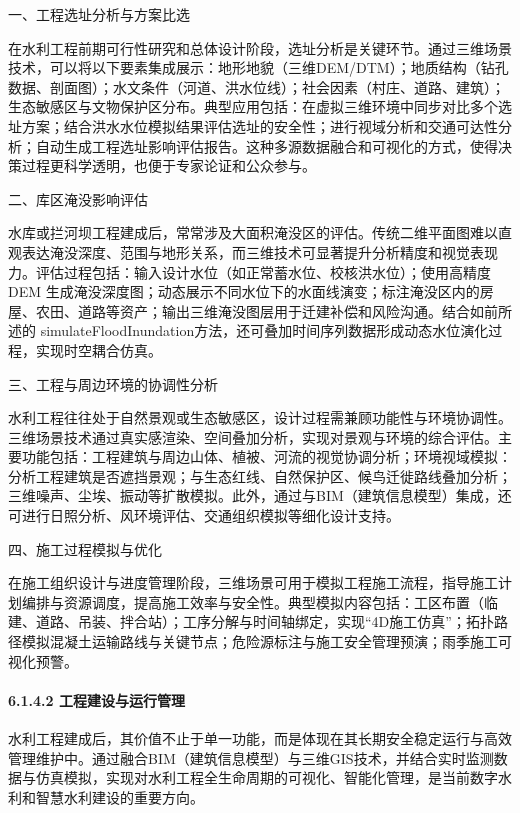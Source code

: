 一、工程选址分析与方案比选

在水利工程前期可行性研究和总体设计阶段，选址分析是关键环节。通过三维场景技术，可以将以下要素集成展示：地形地貌（三维DEM/DTM）；地质结构（钻孔数据、剖面图）；水文条件（河道、洪水位线）；社会因素（村庄、道路、建筑）；生态敏感区与文物保护区分布。典型应用包括：在虚拟三维环境中同步对比多个选址方案；结合洪水水位模拟结果评估选址的安全性；进行视域分析和交通可达性分析；自动生成工程选址影响评估报告。这种多源数据融合和可视化的方式，使得决策过程更科学透明，也便于专家论证和公众参与。

二、库区淹没影响评估

水库或拦河坝工程建成后，常常涉及大面积淹没区的评估。传统二维平面图难以直观表达淹没深度、范围与地形关系，而三维技术可显著提升分析精度和视觉表现力。评估过程包括：输入设计水位（如正常蓄水位、校核洪水位）；使用高精度 DEM 生成淹没深度图；动态展示不同水位下的水面线演变；标注淹没区内的房屋、农田、道路等资产；输出三维淹没图层用于迁建补偿和风险沟通。结合如前所述的 simulateFloodInundation方法，还可叠加时间序列数据形成动态水位演化过程，实现时空耦合仿真。

三、工程与周边环境的协调性分析

水利工程往往处于自然景观或生态敏感区，设计过程需兼顾功能性与环境协调性。三维场景技术通过真实感渲染、空间叠加分析，实现对景观与环境的综合评估。主要功能包括：工程建筑与周边山体、植被、河流的视觉协调分析；环境视域模拟：分析工程建筑是否遮挡景观；与生态红线、自然保护区、候鸟迁徙路线叠加分析；三维噪声、尘埃、振动等扩散模拟。此外，通过与BIM（建筑信息模型）集成，还可进行日照分析、风环境评估、交通组织模拟等细化设计支持。

四、施工过程模拟与优化

在施工组织设计与进度管理阶段，三维场景可用于模拟工程施工流程，指导施工计划编排与资源调度，提高施工效率与安全性。典型模拟内容包括：工区布置（临建、道路、吊装、拌合站）；工序分解与时间轴绑定，实现``4D施工仿真''；拓扑路径模拟混凝土运输路线与关键节点；危险源标注与施工安全管理预演；雨季施工可视化预警。

\paragraph{6.1.4.2 工程建设与运行管理}\label{ux5de5ux7a0bux5efaux8bbeux4e0eux8fd0ux884cux7ba1ux7406}

水利工程建成后，其价值不止于单一功能，而是体现在其长期安全稳定运行与高效管理维护中。通过融合BIM（建筑信息模型）与三维GIS技术，并结合实时监测数据与仿真模拟，实现对水利工程全生命周期的可视化、智能化管理，是当前数字水利和智慧水利建设的重要方向。

